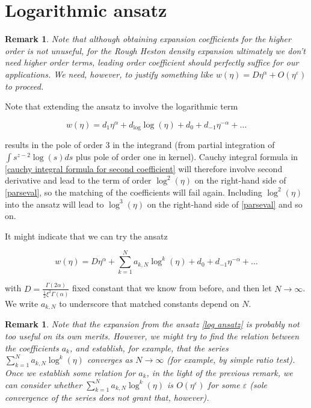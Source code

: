 \documentclass[12pt]{article}
\theoremstyle{plain}
\newtheorem{remark}[proposition]{Remark}
\begin{document}
\section{Logarithmic ansatz}

\begin{remark}

Note that although obtaining expansion coefficients for the higher order is not unuseful, for the Rough Heston density expansion ultimately we don't need higher order terms, leading order coefficient should perfectly suffice for our applications. We need, however, to justify something like $w(\eta) = D\eta^\alpha + O(\eta^\varepsilon)$ to proceed.

\end{remark}

Note that extending the ansatz to involve the logarithmic term

$$
w(\eta) = d_1 \eta^\alpha + d_\text{log} \log (\eta) + d_0 + d_{-1} \eta ^ {-\alpha} + \dots
$$

results in the pole of order 3 in the integrand (from partial integration of $\int s^{z-2} \log (s) ds$ plus pole of order one in kernel). Cauchy integral formula in \eqref{cauchy integral formula for second coefficient} will therefore involve second derivative and lead to the term of order $\log ^2 (\eta)$ on the right-hand side of \eqref{parseval}, so the matching of the coefficients will fail again. Including $\log ^2 (\eta)$ into the ansatz will lead to $\log ^3 (\eta)$ on the right-hand side of \eqref{parseval} and so on.

It might indicate that we can try the ansatz

\begin{equation} \label{log ansatz}
w(\eta) = D \eta^\alpha + \sum_{k=1}^N a_{k, N} \log ^k (\eta) + d_0 + d_{-1} \eta ^ {-\alpha} + \dots
\end{equation}

with $D = \frac{\Gamma(2\alpha)}{\frac 12 \xi ^2 \Gamma(\alpha)}$ fixed constant that we know from before, and then let $N\rightarrow \infty$. We write $a_{k,N}$ to underscore that matched constants depend on $N$.

\begin{remark}

Note that the expansion from the ansatz \eqref{log ansatz} is probably not too useful on its own merits. However, we might try to find the relation between the coefficients $a_k$, and establish, for example, that the series $\sum_{k=1}^N a_{k, N} \log ^k (\eta)$ converges as $N\rightarrow \infty$ (for example, by simple ratio test). Once we establish some relation for $a_k$, in the light of the previous remark, we can consider whether $\sum_{k=1}^N a_{k, N} \log ^k (\eta)$ is $O(\eta ^\varepsilon)$ for some $\varepsilon$ (sole convergence of the series does not grant that, however).

\end{remark}
\end{document}
